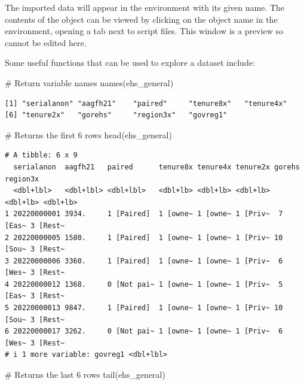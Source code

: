 \documentclass[
  letterpaper,
  DIV=11,
  numbers=noendperiod]{scrreprt}
\newenvironment{Shaded}{\begin{snugshade}}{\end{snugshade}}
\newcommand{\CommentTok}[1]{\textcolor[rgb]{0.37,0.37,0.37}{#1}}
\newcommand{\FunctionTok}[1]{\textcolor[rgb]{0.28,0.35,0.67}{#1}}
\newcommand{\NormalTok}[1]{\textcolor[rgb]{0.00,0.23,0.31}{#1}}
\begin{document}
The imported data will appear in the environment with its given name.
The contents of the object can be viewed by clicking on the object name
in the environment, opening a tab next to script files. This window is a
preview so cannot be edited here.

Some useful functions that can be used to explore a dataset include:

\begin{Shaded}
\begin{Highlighting}[]
\CommentTok{\# Return variable names}
\FunctionTok{names}\NormalTok{(ehs\_general)}
\end{Highlighting}
\end{Shaded}

\begin{verbatim}
[1] "serialanon" "aagfh21"    "paired"     "tenure8x"   "tenure4x"  
[6] "tenure2x"   "gorehs"     "region3x"   "govreg1"   
\end{verbatim}

\begin{Shaded}
\begin{Highlighting}[]
\CommentTok{\# Returns the first 6 rows}
\FunctionTok{head}\NormalTok{(ehs\_general)}
\end{Highlighting}
\end{Shaded}

\begin{verbatim}
# A tibble: 6 x 9
  serialanon  aagfh21   paired      tenure8x tenure4x tenure2x gorehs   region3x
  <dbl+lbl>   <dbl+lbl> <dbl+lbl>   <dbl+lb> <dbl+lb> <dbl+lb> <dbl+lb> <dbl+lb>
1 20220000001 3934.     1 [Paired]  1 [owne~ 1 [owne~ 1 [Priv~  7 [Eas~ 3 [Rest~
2 20220000005 1580.     1 [Paired]  1 [owne~ 1 [owne~ 1 [Priv~ 10 [Sou~ 3 [Rest~
3 20220000006 3360.     1 [Paired]  1 [owne~ 1 [owne~ 1 [Priv~  6 [Wes~ 3 [Rest~
4 20220000012 1368.     0 [Not pai~ 1 [owne~ 1 [owne~ 1 [Priv~  5 [Eas~ 3 [Rest~
5 20220000013 9847.     1 [Paired]  1 [owne~ 1 [owne~ 1 [Priv~ 10 [Sou~ 3 [Rest~
6 20220000017 3262.     0 [Not pai~ 1 [owne~ 1 [owne~ 1 [Priv~  6 [Wes~ 3 [Rest~
# i 1 more variable: govreg1 <dbl+lbl>
\end{verbatim}

\begin{Shaded}
\begin{Highlighting}[]
\CommentTok{\# Returns the last 6 rows}
\FunctionTok{tail}\NormalTok{(ehs\_general)}
\end{Highlighting}
\end{Shaded}
\end{document}
